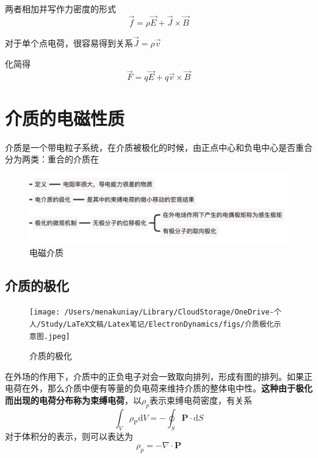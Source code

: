 		两者相加并写作力密度的形式
			\begin{equation}
			\vec{f}=\rho \vec{E}+\vec{J} \times \vec{B}
			\end{equation}

		对于单个点电荷，很容易得到关系$\vec{J}=\rho \vec{v}$

		化简得
			\begin{equation}
				\vec{F}=q \vec{E}+q \vec{v} \times \vec{B}
			\end{equation}

\section{介质的电磁性质}
	介质是一个带电粒子系统，在介质被极化的时候，由正点中心和负电中心是否重合分为两类：重合的介质在
		\begin{figure}[H]
			\centering  %
			\includegraphics[width=0.8\linewidth]{figs/电磁介质.jpg}
			\caption{电磁介质} %
			\label{fig.电磁介质}
		\end{figure}

	\subsection{介质的极化}
		\begin{figure}%
      		\centering
      		\texttt{[image: /Users/menakuniay/Library/CloudStorage/OneDrive-个人/Study/LaTeX文稿/Latex笔记/ElectronDynamics/figs/介质极化示意图.jpeg]}
      		\caption{介质的极化}
      		\label{fig.介质的极化}
      		\end{figure}
      		在外场的作用下，介质中的正负电子对会一致取向排列，形成有图的排列。如果正电荷在外，那么介质中便有等量的负电荷来维持介质的整体电中性。\textbf{这种由于极化而出现的电荷分布称为束缚电荷}，以$\rho_p$表示束缚电荷密度，有关系
		\begin{equation}
			\int_{V} \rho_{\mathrm{P}} \mathrm{d} V=-\oint_{S} \boldsymbol{P} \cdot \mathrm{d} S
		\end{equation}
		对于体积分的表示，则可以表达为
			\begin{equation}
			\rho_p=- \nabla \cdot \mathbf{P}
			\end{equation}
		
